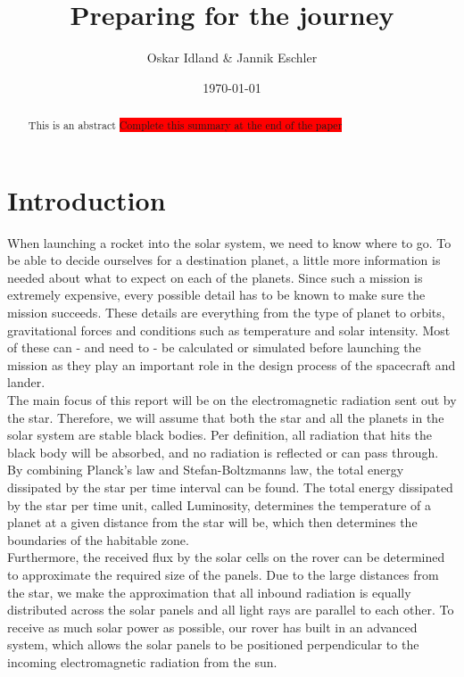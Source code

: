 \documentclass[reprint,english,notitlepage]{revtex4-2}
\begin{document}
\title{Preparing for the journey}
\author{Oskar Idland \& Jannik Eschler}
\date{\today}

\begin{abstract}
This is an abstract \colorbox{red}{Complete this summary at the end of the paper}
\end{abstract}
\maketitle

\section{Introduction} \label{sec:introduction}
When launching a rocket into the solar system, we need to know where to go.
To be able to decide ourselves for a destination planet, a little more information is needed about what to expect on each of the planets.
Since such a mission is extremely expensive, every possible detail has to be known to make sure the mission succeeds.
These details are everything from the type of planet to orbits, gravitational forces and conditions such as temperature and solar intensity.
Most of these can - and need to - be calculated or simulated before launching the mission as they play an important role in the design process of the spacecraft and lander.\\
The main focus of this report will be on the electromagnetic radiation sent out by the star.
Therefore, we will assume that both the star and all the planets in the solar system are stable black bodies.
Per definition, all radiation that hits the black body will be absorbed, and no radiation is reflected or can pass through.\\
By combining Planck's law and Stefan-Boltzmanns law, the total energy dissipated by the star per time interval can be found.
The total energy dissipated by the star per time unit, called Luminosity, determines the temperature of a planet at a given distance from the star will be, which then determines the boundaries of the habitable zone.\\
Furthermore, the received flux by the solar cells on the rover can be determined to approximate the required size of the panels.
Due to the large distances from the star, we make the approximation that all inbound radiation is equally distributed across the solar panels and all light rays are parallel to each other.
To receive as much solar power as possible, our rover has built in an advanced system, which allows the solar panels to be positioned perpendicular to the incoming electromagnetic radiation from the sun.\\
\end{document}
